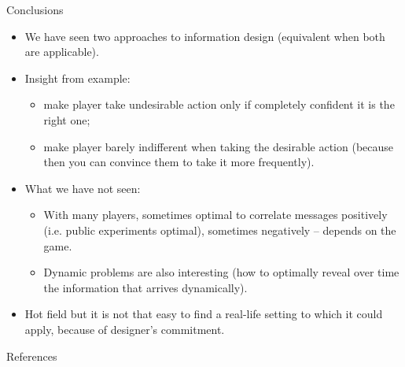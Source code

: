 \documentclass[english,10pt
,aspectratio=169
]{beamer}
\begin{document}
\begin{frame}{Conclusions}
\begin{itemize}
	\item We have seen two approaches to information design (equivalent when both are applicable).
	\item Insight from example: 
	\begin{itemize}
		\item make player take undesirable action only if completely confident it is the right one;
		\item make player barely indifferent when taking the desirable action (because then you can convince them to take it more frequently).
	\end{itemize}
	\item What we have not seen:
	\begin{itemize}
		\item With many players, sometimes optimal to correlate messages positively (i.e. public experiments optimal), sometimes negatively -- depends on the game.
		\item Dynamic problems are also interesting (how to optimally reveal over time the information that arrives dynamically).
	\end{itemize}
	\item Hot field but it is not that easy to find a real-life setting to which it could apply, because of designer's \alert{commitment}.
\end{itemize}
\end{frame}




\appendix
\begin{frame}[allowframebreaks]{References}
	
	
\end{frame}
\end{document}
